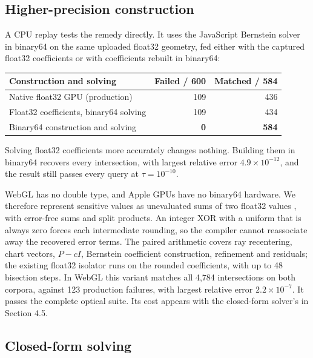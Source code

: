 \documentclass{jcgt}
\begin{document}
\subsection{Higher-precision
construction}\label{higher-precision-construction}

A CPU replay tests the remedy directly. It uses the JavaScript Bernstein
solver in binary64 on the same uploaded float32 geometry, fed either
with the captured float32 coefficients or with coefficients rebuilt in
binary64:

{
\begin{longtable}[]{@{}lrr@{}}
\toprule\noalign{}
Construction and solving & Failed / 600 & Matched / 584 \\
\midrule\noalign{}
\endhead
\bottomrule\noalign{}
\endlastfoot
Native float32 GPU (production) & 109 & 436 \\
Float32 coefficients, binary64 solving & 109 & 434 \\
Binary64 construction and solving & \textbf{0} & \textbf{584} \\
\end{longtable}
}

Solving float32 coefficients more accurately changes nothing. Building
them in binary64 recovers every intersection, with largest relative
error \(4.9\times10^{-12}\), and the result still passes every query at
\(\tau=10^{-10}\).

WebGL has no double type, and Apple GPUs have no binary64 hardware. We
therefore represent sensitive values as unevaluated sums of two float32
values \citep{dekker1971}, with error-free sums and split products. An
integer XOR with a uniform that is always zero forces each intermediate
rounding, so the compiler cannot reassociate away the recovered error
terms. The paired arithmetic covers ray recentering, chart vectors,
\(P-cI\), Bernstein coefficient construction, refinement and residuals;
the existing float32 isolator runs on the rounded coefficients, with up
to 48 bisection steps. In WebGL this variant matches all 4,784
intersections on both corpora, against 123 production failures, with
largest relative error \(2.2\times10^{-7}\). It passes the complete
optical suite. Its cost appears with the closed-form solver's in Section
4.5.

\subsection{Closed-form solving}\label{closed-form-solving}
\end{document}

